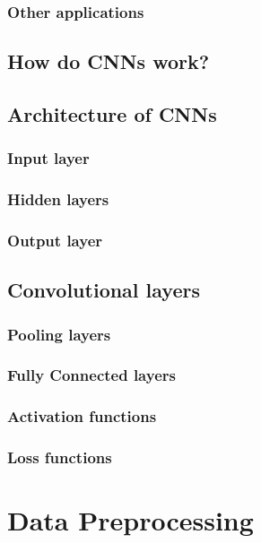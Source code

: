 \subsection{Other applications}

\section{How do CNNs work?}



\section{Architecture of CNNs}

\subsection{Input layer}
\subsection{Hidden layers}
\subsection{Output layer}



\section{Convolutional layers}

\subsection{Pooling layers}
\subsection{Fully Connected layers}
\subsection{Activation functions}
\subsection{Loss functions}






\chapter{Data Preprocessing}

